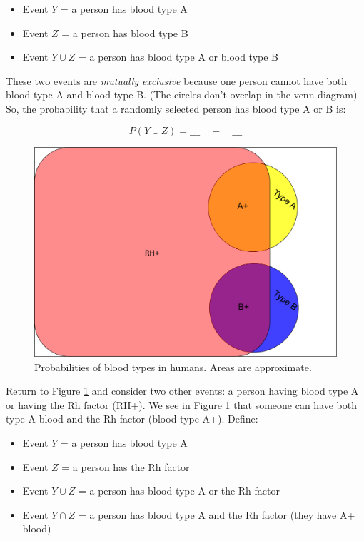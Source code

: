 \documentclass[]{book}
\providecommand{\tightlist}{%
  \setlength{\itemsep}{0pt}\setlength{\parskip}{0pt}}
\theoremstyle{definition}
\theoremstyle{definition}
\theoremstyle{remark}
\begin{document}
\begin{itemize}
\tightlist
\item
  Event \(Y\) = a person has blood type A
\item
  Event \(Z\) = a person has blood type B
\item
  Event \(Y \cup Z\) = a person has blood type A or blood type B
\end{itemize}

These two events are \emph{mutually exclusive} because one person cannot
have both blood type A and blood type B. (The circles don't overlap in
the venn diagram) So, the probability that a randomly selected person
has blood type A or B is:

\[ P(Y \cup Z) = \_\_\_ \quad + \quad \_\_\_\]

\begin{figure}[h]

{\centering \includegraphics[width=.5\linewidth]{img/bloodvenndiag} 

}

\caption{Probabilities of blood types in humans. Areas are approximate.}\label{fig:bloodvendiag}
\end{figure}

Return to Figure \ref{fig:bloodvendiag} and consider two other events: a
person having blood type A or having the Rh factor (RH+). We see in
Figure \ref{fig:bloodvendiag} that someone can have both type A blood
and the Rh factor (blood type A+). Define:

\begin{itemize}
\tightlist
\item
  Event \(Y\) = a person has blood type A
\item
  Event \(Z\) = a person has the Rh factor
\item
  Event \(Y \cup Z\) = a person has blood type A or the Rh factor
\item
  Event \(Y \cap Z\) = a person has blood type A and the Rh factor (they
  have A+ blood)
\end{itemize}
\end{document}
